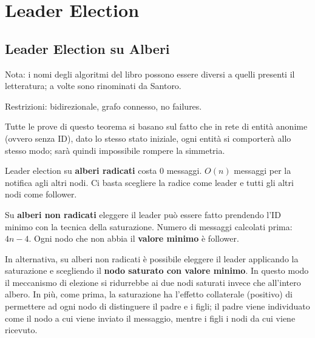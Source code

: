 \section{Leader Election}
\subsection{Leader Election su Alberi}
Nota: i nomi degli algoritmi del libro possono essere diversi a quelli presenti il letteratura; a volte sono rinominati da Santoro.



Restrizioni: bidirezionale, grafo connesso, no failures.


Tutte le prove di questo teorema si basano sul fatto che in rete di entità anonime (ovvero senza ID), dato lo stesso stato iniziale,
ogni entità si comporterà allo stesso modo; sarà quindi impossibile rompere la simmetria.

Leader election su \textbf{alberi radicati} costa 0 messaggi. $O(n)$ messaggi per la notifica agli altri nodi.
Ci basta scegliere la radice come leader e tutti gli altri nodi come follower.

Su \textbf{alberi non radicati} eleggere il leader può essere fatto prendendo l'ID minimo con la tecnica della saturazione.
Numero di messaggi calcolati prima: $4n-4$. Ogni nodo che non abbia il \textbf{valore minimo} è follower.

In alternativa, su alberi non radicati è possibile eleggere il leader applicando la saturazione e scegliendo il \textbf{nodo saturato con
valore minimo}. In questo modo il meccanismo di elezione si ridurrebbe ai due nodi saturati invece che all'intero albero.
In più, come prima, la saturazione ha l'effetto collaterale (positivo) di permettere ad ogni nodo di distinguere il padre e i figli;
il padre viene individuato come il nodo a cui viene inviato il messaggio, mentre i figli i nodi da cui viene ricevuto.


